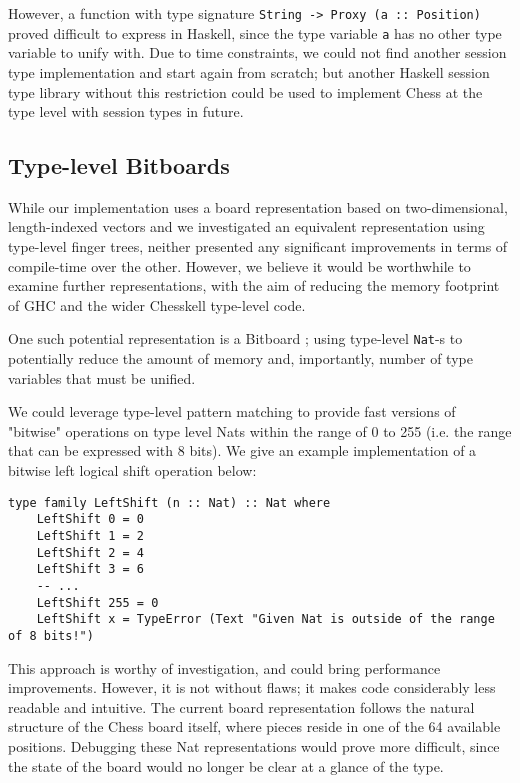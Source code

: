 \documentclass[12pt, a4paper, bibliography=totocnumbered]{scrreprt}
\newcommand{\inline}[1]{\lstinline[basicstyle=\ttfamily\footnotesize]{#1}}
\begin{document}
However, a function with type signature \inline{String -> Proxy (a :: Position)} proved difficult to express in Haskell, since the type variable \inline{a} has no other type variable to unify with. Due to time constraints, we could not find another session type implementation and start again from scratch; but another Haskell session type library without this restriction could be used to implement Chess at the type level with session types in future.

\subsection{Type-level Bitboards}

While our implementation uses a board representation based on two-dimensional, length-indexed vectors and we investigated an equivalent representation using type-level finger trees, neither presented any significant improvements in terms of compile-time over the other. However, we believe it would be worthwhile to examine further representations, with the aim of reducing the memory footprint of GHC and the wider Chesskell type-level code.

One such potential representation is a Bitboard \cite{bitboard}; using type-level \inline{Nat}-s to potentially reduce the amount of memory and, importantly, number of type variables that must be unified.

We could leverage type-level pattern matching to provide fast versions of "bitwise" operations on type level Nats within the range of 0 to 255 (i.e. the range that can be expressed with 8 bits). We give an example implementation of a bitwise left logical shift operation below:

\begin{lstlisting}
type family LeftShift (n :: Nat) :: Nat where
    LeftShift 0 = 0
    LeftShift 1 = 2
    LeftShift 2 = 4
    LeftShift 3 = 6
    -- ...
    LeftShift 255 = 0
    LeftShift x = TypeError (Text "Given Nat is outside of the range of 8 bits!")
\end{lstlisting}

This approach is worthy of investigation, and could bring performance improvements. However, it is not without flaws; it makes code considerably less readable and intuitive. The current board representation follows the natural structure of the Chess board itself, where pieces reside in one of the 64 available positions. Debugging these Nat representations would prove more difficult, since the state of the board would no longer be clear at a glance of the type.
\end{document}
